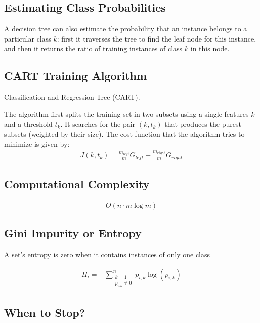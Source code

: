 \documentclass[10pt]{article}
\begin{document}
  \subsection{Estimating Class Probabilities}%
  \label{sub:estimating_class_probabilities}

  A decision tree can also estimate the probability that an instance belongs to a
  particular class $k$: first it traverses the tree to find the leaf node for
  this instance, and then it returns the ratio of training instances of class $k$
  in this node.

  \subsection{CART Training Algorithm}%
  \label{sub:cart_training_algorithm}

  Classification and Regression Tree (CART).

  The algorithm first splits the training set in two subsets using a single
  features $k$ and a threshold $t_k$. It searches for the pair $(k, t_k)$ that
  produces the purest subsets (weighted by their size). The cost function that
  the algorithm tries to minimize is given by:
  \begin{align}
    J(k,t_k)=\frac{m_{left}}{m}G_{left}+\frac{m_{right}}{m}G_{right}
  \end{align}

  \subsection{Computational Complexity}%
  \label{sub:computational_complexity}

  \begin{align}
    O(n\cdot m\log m)
  \end{align}

  \subsection{Gini Impurity or Entropy}%
  \label{sub:gini_impurity_or_entropy}

  A set's entropy is zero when it contains instances of only one class

  \begin{align}
    H_i=-\sum_{\substack{k=1 \\ p_{i,k}\neq 0}}^{n}p_{i,k}\log\left(p_{i,k}\right)
  \end{align}

  \subsection{When to Stop?}%
  \label{sub:when_to_stop_}
\end{document}
